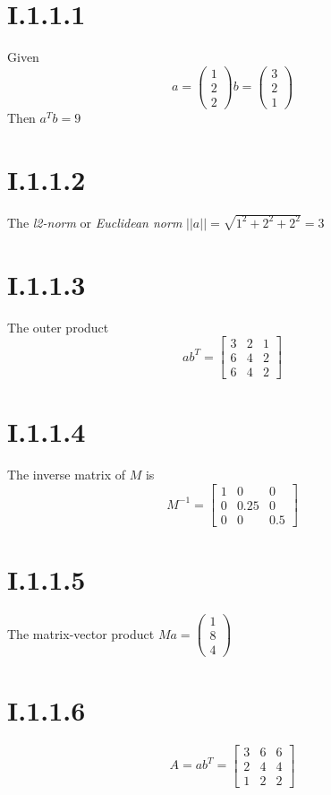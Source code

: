 \section*{I.1.1.1}
Given
\[
	a = \begin{pmatrix} 1\\2\\2 \end{pmatrix}
	b = \begin{pmatrix} 3\\2\\1 \end{pmatrix}
\]
Then $a^Tb = 9$

\section*{I.1.1.2}
The \textit{l2-norm} or \textit{Euclidean norm} $||a|| = \sqrt{1^2 + 2^2 + 2^2} = 3$

\section*{I.1.1.3}
The outer product
\[
	ab^T = \begin{bmatrix}
		3 & 2 & 1 \\
		6 & 4 & 2 \\
		6 & 4 & 2
	       \end{bmatrix}
\]

\section*{I.1.1.4}
The inverse matrix of $M$ is
\[
	M^{-1} = \begin{bmatrix}
		1 & 0 & 0 \\
		0 & 0.25 & 0 \\
		0 & 0 & 0.5
	\end{bmatrix}
\]

\section*{I.1.1.5}
The matrix-vector product $Ma = \begin{pmatrix}1 \\ 8 \\ 4\end{pmatrix}$

\section*{I.1.1.6}
\[
	A = ab^T = \begin{bmatrix}
		3 & 6 & 6 \\
		2 & 4 & 4 \\
		1 & 2 & 2
	\end{bmatrix}
\]

